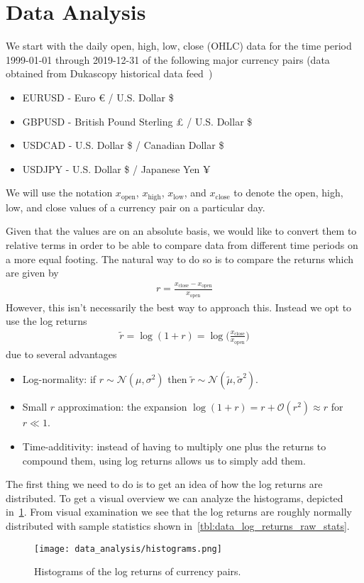 \section{Data Analysis}
We start with the daily open, high, low, close (OHLC) data for the time period 1999-01-01 through 2019-12-31 of the following major currency pairs (data obtained from Dukascopy historical data feed~\cite{dukascopy})
\begin{itemize}
    \item EURUSD - Euro € / U.S. Dollar \$
    \item GBPUSD - British Pound Sterling £ / U.S. Dollar \$
    \item USDCAD - U.S. Dollar \$ / Canadian Dollar \$
    \item USDJPY - U.S. Dollar \$ / Japanese Yen ¥
\end{itemize}
We will use the notation \( x_\text{open} \), \( x_\text{high} \), \( x_\text{low} \), and \( x_\text{close} \) to denote the open, high, low, and close values of a currency pair on a particular day.

Given that the values are on an absolute basis, we would like to convert them to relative terms in order to be able to compare data from different time periods on a more equal footing.
The natural way to do so is to compare the returns which are given by
\begin{align}
    r = \frac{x_\text{close} - x_\text{open}}{x_\text{open}}
\end{align}
However, this isn't necessarily the best way to approach this.
Instead we opt to use the log returns
\begin{align}
    \tilde{r}
        = \log(1+r)
        = \log\bigg( \frac{x_\text{close}}{x_\text{open}} \bigg)
\end{align}
due to several advantages~\cite{quantivity_2012}
\begin{itemize}
    \item Log-normality: if \( r \sim \mathcal{N}(\mu, \sigma^2) \) then \( \tilde{r} \sim \mathcal{N}(\tilde{\mu}, \tilde{\sigma}^2) \).
    \item Small \( r \) approximation: the expansion \( \log (1 + r) = r + \mathcal{O}(r^2) \approx r \) for \( r \ll 1 \).
    \item Time-additivity: instead of having to multiply one plus the returns to compound them, using log returns allows us to simply add them.
\end{itemize}

The first thing we need to do is to get an idea of how the log returns are distributed.
To get a visual overview we can analyze the histograms, depicted in~\cref{fig:histograms_raw}.
From visual examination we see that the log returns are roughly normally distributed with sample statistics shown in~\cref{tbl:data_log_returns_raw_stats}.
\begin{figure}[!htb]
    \begin{center}
        \texttt{[image: data\_analysis/histograms.png]}
    \end{center}
    \caption{Histograms of the log returns of currency pairs.}
    \label{fig:histograms_raw}
\end{figure}

